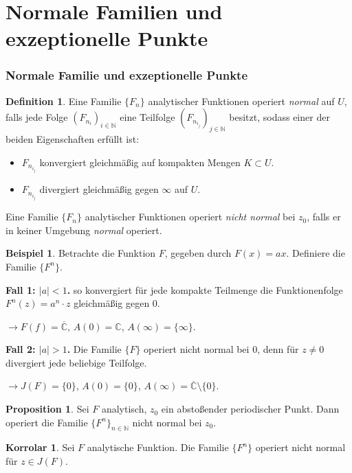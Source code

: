 \documentclass{beamer}
\renewcommand{\bar}{\overline}
\newcommand{\C}{\mathbb{C}}
\newcommand{\N}{\mathbb{N}}
\theoremstyle{definition}
\newcounter{foo}
\newtheorem{df}[foo]{Definition}
\newtheorem{kor}[foo]{Korrolar}
\newtheorem{ex}[foo]{Beispiel}
\newtheorem{prop}[foo]{Proposition}
\begin{document}
\section{Normale Familien und exzeptionelle Punkte}
\begin{frame}
\frametitle{Normale Familie und exzeptionelle Punkte}
\begin{df}
Eine Familie $\{F_n\}$ analytischer Funktionen operiert \emph{normal} auf $U$, falls jede Folge $(F_{n_i})_{i\in \mathbb{N}}$ eine Teilfolge $(F_{n_{i_j}})_{j\in \N}$ besitzt, sodass einer der beiden Eigenschaften erfüllt ist:
\begin{itemize}
\item $F_{n_{i_j}}$ konvergiert gleichmäßig auf kompakten Mengen $K\subset U$.
\item $F_{n_{i_j}}$ divergiert gleichmäßig gegen $\infty$ auf $U$.
\end{itemize}
Eine Familie $\{F_n\}$ analytischer Funktionen operiert \emph{nicht normal} bei $z_0$, falls er in keiner Umgebung \emph{normal} operiert.
\end{df}
\end{frame}

\begin{frame}
\begin{ex}
Betrachte die Funktion $F$, gegeben durch $F(x)=ax$. Definiere die Familie $\{F^n\}$.

\textbf{Fall 1: $|a|<1$.} so konvergiert für jede kompakte Teilmenge die Funktionenfolge $F^n(z)=a^n\cdot z$ gleichmäßig gegen 0. 

$\longrightarrow F(f)=\bar{\mathbb{C}}$, $A(0)=\C$, $A(\infty)=\{\infty\}$.

\textbf{Fall 2: $|a|>1$.} Die Familie $\{F\}$ operiert nicht normal bei $0$, denn für $z\neq 0$ divergiert jede beliebige Teilfolge.

$\longrightarrow J(F)=\{0\}$, $A(0)=\{0\}$, $A(\infty)=\bar{\C}\setminus \{0\}$. 
\end{ex}
\end{frame}

\begin{frame}
\begin{prop}
Sei $F$ analytisch, $z_0$ ein abstoßender periodischer Punkt. Dann operiert die Familie $\{F^n\}_{n\in \N}$ nicht normal bei $z_0$.
\end{prop}

\begin{kor}
Sei $F$ analytische Funktion. Die Familie $\{F^n\}$ operiert nicht normal für $z\in J(F)$.
\end{kor}
\end{frame}
\end{document}
